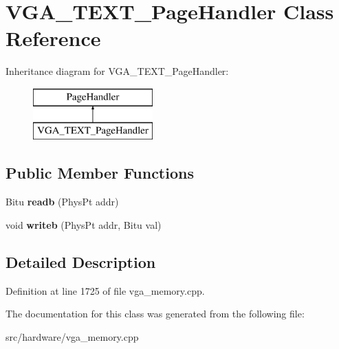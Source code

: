 \hypertarget{classVGA__TEXT__PageHandler}{\section{V\-G\-A\-\_\-\-T\-E\-X\-T\-\_\-\-Page\-Handler Class Reference}
\label{classVGA__TEXT__PageHandler}
}
Inheritance diagram for V\-G\-A\-\_\-\-T\-E\-X\-T\-\_\-\-Page\-Handler\-:\begin{figure}[H]
\begin{center}
\leavevmode
\includegraphics[height=2.000000cm]{classVGA__TEXT__PageHandler}
\end{center}
\end{figure}
\subsection*{Public Member Functions}
\begin{DoxyCompactItemize}
\item 
\hypertarget{classVGA__TEXT__PageHandler_a1db1f4c74e3117342a06f43326d94ce4}{Bitu {\bfseries readb} (Phys\-Pt addr)}\label{classVGA__TEXT__PageHandler_a1db1f4c74e3117342a06f43326d94ce4}

\item 
\hypertarget{classVGA__TEXT__PageHandler_a7615ff08d8fef7047adb7e2176561829}{void {\bfseries writeb} (Phys\-Pt addr, Bitu val)}\label{classVGA__TEXT__PageHandler_a7615ff08d8fef7047adb7e2176561829}

\end{DoxyCompactItemize}


\subsection{Detailed Description}


Definition at line 1725 of file vga\-\_\-memory.\-cpp.



The documentation for this class was generated from the following file\-:\begin{DoxyCompactItemize}
\item 
src/hardware/vga\-\_\-memory.\-cpp\end{DoxyCompactItemize}
